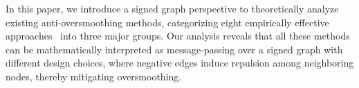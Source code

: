 In this paper, we introduce a signed graph perspective to theoretically analyze existing anti-oversmoothing methods, categorizing eight empirically effective approaches~\citep{contranorm,pairnorm,batchnorm,dropedge,do2020graph,appap,jknet,dagnn} into three major groups. Our analysis reveals that all these methods can be mathematically interpreted as message-passing over a signed graph with different design choices, where negative edges induce repulsion among neighboring nodes, thereby mitigating oversmoothing.  

